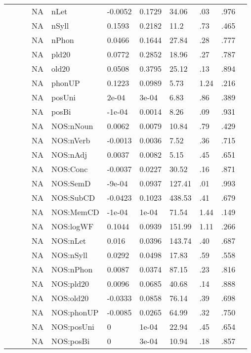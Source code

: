 \begin{table}[ht]
\begin{tabular}{lllllllllll}
   &  &  & NA & nLet & -0.0052 & 0.1729 & 34.06 & .03 & .976 &   \\ 
   &  &  & NA & nSyll & 0.1593 & 0.2182 & 11.2 & .73 & .465 &   \\ 
   &  &  & NA & nPhon & 0.0466 & 0.1644 & 27.84 & .28 & .777 &   \\ 
   &  &  & NA & pld20 & 0.0772 & 0.2852 & 18.96 & .27 & .787 &   \\ 
   &  &  & NA & old20 & 0.0508 & 0.3795 & 25.12 & .13 & .894 &   \\ 
   &  &  & NA & phonUP & 0.1223 & 0.0989 & 5.73 & 1.24 & .216 &   \\ 
   &  &  & NA & posUni & 2e-04 & 3e-04 & 6.83 & .86 & .389 &   \\ 
   &  &  & NA & posBi & -1e-04 & 0.0014 & 8.26 & .09 & .931 &   \\ 
   &  &  & NA & NOS:nNoun & 0.0062 & 0.0079 & 10.84 & .79 & .429 &   \\ 
   &  &  & NA & NOS:nVerb & -0.0013 & 0.0036 & 7.52 & .36 & .715 &   \\ 
   &  &  & NA & NOS:nAdj & 0.0037 & 0.0082 & 5.15 & .45 & .651 &   \\ 
   &  &  & NA & NOS:Conc & -0.0037 & 0.0227 & 30.52 & .16 & .871 &   \\ 
   &  &  & NA & NOS:SemD & -9e-04 & 0.0937 & 127.41 & .01 & .993 &   \\ 
   &  &  & NA & NOS:SubCD & -0.0423 & 0.1023 & 438.53 & .41 & .679 &   \\ 
   &  &  & NA & NOS:MemCD & -1e-04 & 1e-04 & 71.54 & 1.44 & .149 &   \\ 
   &  &  & NA & NOS:logWF & 0.1044 & 0.0939 & 151.99 & 1.11 & .266 &   \\ 
   &  &  & NA & NOS:nLet & 0.016 & 0.0396 & 143.74 & .40 & .687 &   \\ 
   &  &  & NA & NOS:nSyll & 0.0292 & 0.0498 & 17.83 & .59 & .558 &   \\ 
   &  &  & NA & NOS:nPhon & 0.0087 & 0.0374 & 87.15 & .23 & .816 &   \\ 
   &  &  & NA & NOS:pld20 & 0.0096 & 0.0685 & 40.68 & .14 & .888 &   \\ 
   &  &  & NA & NOS:old20 & -0.0333 & 0.0858 & 76.14 & .39 & .698 &   \\ 
   &  &  & NA & NOS:phonUP & -0.0085 & 0.0265 & 64.99 & .32 & .750 &   \\ 
   &  &  & NA & NOS:posUni & 0 & 1e-04 & 22.94 & .45 & .654 &   \\ 
   &  &  & NA & NOS:posBi & 0 & 3e-04 & 10.94 & .18 & .857 &   \\ 

\end{tabular}
\end{table}
